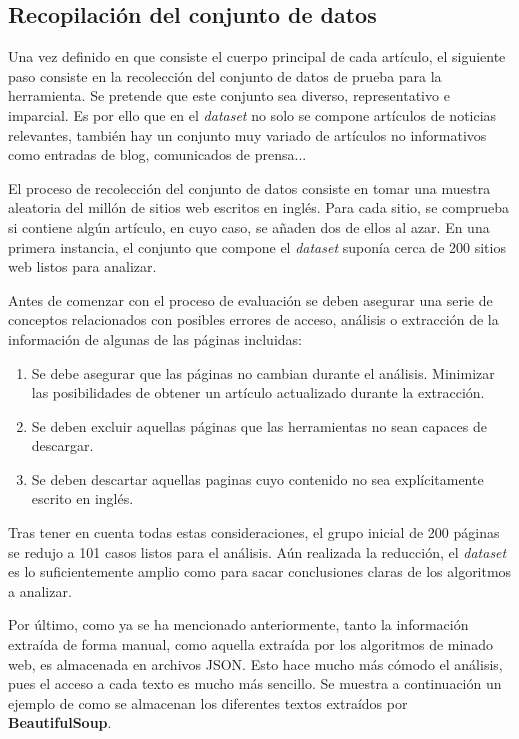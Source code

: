 \subsection{Recopilación del conjunto de datos}
\label{subsec:recopilacion del conjunto de datos}

Una vez definido en que consiste el cuerpo principal de cada artículo, el siguiente paso consiste en la
recolección del conjunto de datos de prueba para la herramienta. Se pretende que este conjunto sea diverso, 
representativo e imparcial. Es por ello que en el \emph{dataset} no solo se compone artículos de noticias 
relevantes, también hay un conjunto muy variado de artículos no informativos como entradas de blog, 
comunicados de prensa...

El proceso de recolección del conjunto de datos consiste en tomar una muestra aleatoria del millón de
sitios web escritos en inglés. Para cada sitio, se comprueba si contiene algún artículo, en cuyo caso, se
añaden dos de ellos al azar. En una primera instancia, el conjunto que compone el \emph{dataset} suponía
cerca de 200 sitios web listos para analizar.

Antes de comenzar con el proceso de evaluación se deben asegurar una serie de conceptos relacionados con
posibles errores de acceso, análisis o extracción de la información de algunas de las páginas incluidas:

\begin{enumerate}
  \item Se debe asegurar que las páginas no cambian durante el análisis. Minimizar las posibilidades de 
  obtener un artículo actualizado durante la extracción.
  \item Se deben excluir aquellas páginas que las herramientas no sean capaces de descargar.
  \item Se deben descartar aquellas paginas cuyo contenido no sea explícitamente escrito en inglés.
\end{enumerate}

Tras tener en cuenta todas estas consideraciones, el grupo inicial de 200 páginas se redujo a 101 casos
listos para el análisis. Aún realizada la reducción, el \emph{dataset} es lo suficientemente amplio como
para sacar conclusiones claras de los algoritmos a analizar.

Por último, como ya se ha mencionado anteriormente, tanto la información extraída de forma manual, como
aquella extraída por los algoritmos de minado web, es almacenada en archivos JSON. Esto hace mucho más
cómodo el análisis, pues el acceso a cada texto es mucho más sencillo. Se muestra a continuación un ejemplo
de como se almacenan los diferentes textos extraídos por \textbf{BeautifulSoup}.

